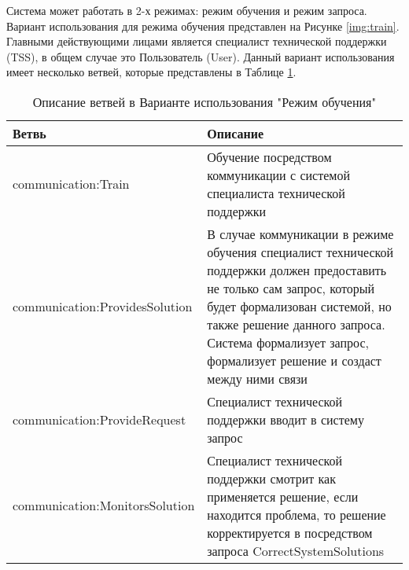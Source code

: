 Система может работать в 2-х режимах: режим обучения и режим запроса. Вариант использования для режима обучения представлен на Рисунке \ref{img:train}. Главными действующими лицами является специалист технической поддержки (TSS), в общем случае это Пользователь (User). Данный вариант использования имеет несколько ветвей, которые представлены в Таблице \ref{TrainUseCaseTable}.

\begin{table} [htbp]
  \centering
  \parbox{15cm}{\caption{Описание ветвей в Варианте использования "Режим обучения" }\label{TrainUseCaseTable}}
  \begin{tabular}{| p{7cm} || p{7cm} |}
  \hline
  \hline
Ветвь & Описание \\
  \hline
    \hline
communication:Train	& Обучение посредством коммуникации с системой специалиста технической поддержки \\
  \hline
communication:ProvidesSolution  & В случае коммуникации в режиме обучения специалист технической поддержки должен предоставить не только сам запрос, который будет формализован системой, но также решение данного запроса. Система формализует запрос, формализует решение и создаст между ними связи \\
  \hline
communication:ProvideRequest & Специалист технической поддержки вводит в систему запрос \\
  \hline
communication:MonitorsSolution  & Специалист технической поддержки смотрит как применяется решение, если находится проблема, то решение корректируется в посредством запроса CorrectSystemSolutions \\
  \hline
  \hline
  \end{tabular}
\end{table}

